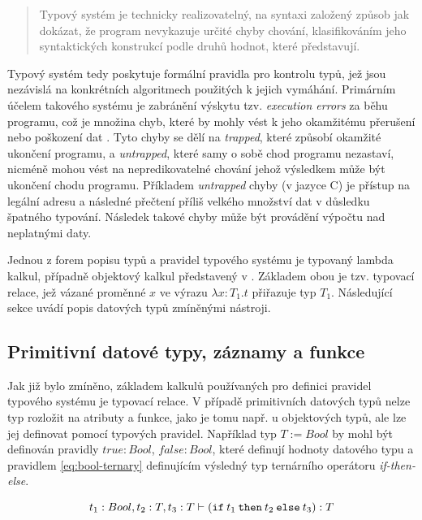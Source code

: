 \documentclass[czech,DP]{thesiskiv}
\begin{document}
\begin{quote}
	Typový systém je technicky realizovatelný, na syntaxi založený způsob jak dokázat, že program nevykazuje určité chyby chování, klasifikováním jeho syntaktických konstrukcí podle druhů hodnot, které představují.
\end{quote}

Typový systém tedy poskytuje formální pravidla pro kontrolu typů, jež jsou nezávislá na konkrétních algoritmech použitých k jejich vymáhání. Primárním účelem takového systému je zabránění výskytu tzv. \textit{execution errors} za běhu programu, což je množina chyb, které by mohly vést k jeho okamžitému přerušení nebo poškození dat \cite{cardelli2004}. Tyto chyby se dělí na \textit{trapped}, které způsobí okamžité ukončení programu, a \textit{untrapped}, které samy o sobě chod programu nezastaví, nicméně mohou vést na nepredikovatelné chování jehož výsledkem může být ukončení chodu programu. Příkladem \textit{untrapped} chyby (v jazyce C) je přístup na legální adresu a následné přečtení příliš velkého množství dat v důsledku špatného typování. Následek takové chyby může být provádění výpočtu nad neplatnými daty.


Jednou z forem popisu typů a pravidel typového systému je typovaný lambda kalkul, případně objektový kalkul představený v \cite{abadi2006}. Základem obou je tzv. typovací relace, jež vázané proměnné $x$ ve výrazu $\lambda x:T_1.t$ přiřazuje typ $T_1$. Následující sekce uvádí popis datových typů zmíněnými nástroji.

\subsection{Primitivní datové typy, záznamy a funkce}

Jak již bylo zmíněno, základem kalkulů používaných pro definici pravidel typového systému je typovací relace. V případě primitivních datových typů nelze typ rozložit na atributy a funkce, jako je tomu např. u objektových typů, ale lze jej definovat pomocí typových pravidel. Například typ $T := Bool$ by mohl být definován pravidly $true: Bool$, $false: Bool$, které definují hodnoty datového typu a pravidlem \ref{eq:bool-ternary} definujícím výsledný typ ternárního operátoru \textit{if-then-else}.

\begin{equation}
	t_1: Bool, t_2:T, t_3:T \vdash (\verb|if|\: t_1\: \verb|then|\: t_2\: \verb|else|\: t_3):T
	\label{eq:bool-ternary}
\end{equation}
\end{document}
